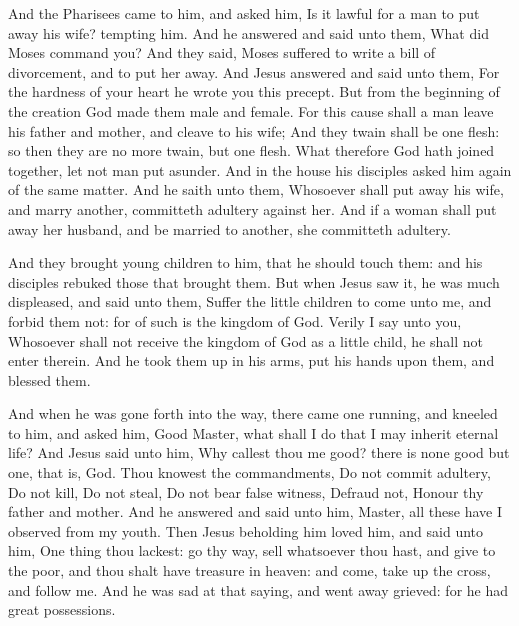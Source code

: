  And the Pharisees came to him, and asked him, Is it
lawful for a man to put away his wife? tempting him.  And
he answered and said unto them, What did Moses command you?
 And they said, Moses suffered to write a bill of
divorcement, and to put her away.  And Jesus answered and
said unto them, For the hardness of your heart he wrote you this
precept.  But from the beginning of the creation God made
them male and female.  For this cause shall a man leave
his father and mother, and cleave to his wife;  And they
twain shall be one flesh: so then they are no more twain, but one flesh.
 What therefore God hath joined together, let not man put
asunder.  And in the house his disciples asked him again
of the same matter.  And he saith unto them, Whosoever
shall put away his wife, and marry another, committeth adultery against
her.  And if a woman shall put away her husband, and be
married to another, she committeth adultery.

 And they brought young children to him, that he should
touch them: and his disciples rebuked those that brought them.
 But when Jesus saw it, he was much displeased, and said
unto them, Suffer the little children to come unto me, and forbid them
not: for of such is the kingdom of God.  Verily I say
unto you, Whosoever shall not receive the kingdom of God as a little
child, he shall not enter therein.  And he took them up
in his arms, put his hands upon them, and blessed them.

 And when he was gone forth into the way, there came one
running, and kneeled to him, and asked him, Good Master, what shall I do
that I may inherit eternal life?  And Jesus said unto
him, Why callest thou me good? there is none good but one, that is, God.
 Thou knowest the commandments, Do not commit adultery,
Do not kill, Do not steal, Do not bear false witness, Defraud not,
Honour thy father and mother.  And he answered and said
unto him, Master, all these have I observed from my youth.
 Then Jesus beholding him loved him, and said unto him,
One thing thou lackest: go thy way, sell whatsoever thou hast, and give
to the poor, and thou shalt have treasure in heaven: and come, take up
the cross, and follow me.  And he was sad at that saying,
and went away grieved: for he had great possessions.

